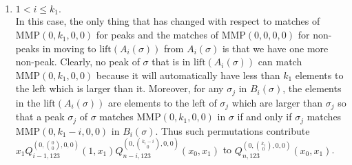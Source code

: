 \documentclass[
final,nomarks
]{dmtcs-episciences}
\newcommand{\lift}{\mathrm{lift}}
\newcommand{\Qmzn}[3]{Q_{#3,123}^{(0,\binom{#1}{#2},0,0)}(x_0,x_1)}
\newcommand{\MMP}{\mathrm{MMP}}
\begin{document}
\begin{enumerate}[{\bf Case }\bf 1.]
	\item \begin{math}1 < i \leq k_1.\end{math}\\
	In this case, the only thing that has changed with respect to matches of \begin{math}\MMP(0,k_1,0,0)\end{math} 
	for peaks and the matches of \begin{math}\MMP(0,0,0,0)\end{math} for non-peaks in moving  
	to \begin{math}\mathrm{lift}(A_i(\sigma))\end{math} from \begin{math}A_i(\sigma)\end{math} is that we have one more non-peak. Clearly, 
	no peak of \begin{math}\sigma\end{math} that is in \begin{math}\lift(A_i(\sigma))\end{math} can match \begin{math}\MMP(0,k_1,0,0)\end{math} because it 
	will automatically have less than \begin{math}k_1\end{math} elements to the left which is larger than it. 
	Moreover, for  any \begin{math}\sigma_j\end{math} in \begin{math}B_i(\sigma)\end{math}, the elements in 
	the \begin{math}\mathrm{lift}(A_i(\sigma))\end{math} are elements to 
	the left of \begin{math}\sigma_j\end{math} which are larger than \begin{math}\sigma_j\end{math} so 
	that a peak \begin{math}\sigma_j\end{math} of \begin{math}\sigma\end{math} matches  \begin{math}\MMP(0,k_1,0,0)\end{math} in \begin{math}\sigma\end{math} if and only if 
	\begin{math}\sigma_j\end{math} matches  \begin{math}\MMP(0,k_1-i,0,0)\end{math} in \begin{math}B_i(\sigma)\end{math}. Thus such permutations 
	contribute \begin{math}x_1Q_{i-1,123}^{(0,\binom{0}{0},0,0)}(1,x_1)\Qmzn{k_1-i}{0}{n-i}\end{math} to \begin{math}\Qmzn{k_1}{0}{n}\end{math}.
	

\end{enumerate}
\end{document}

